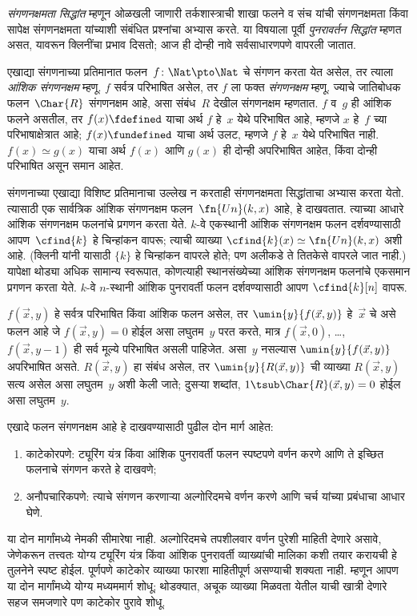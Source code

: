\documentclass[../../../include/open-logic-section]{subfiles}
\begin{document}

\emph{संगणनक्षमता सिद्धांत} म्हणून ओळखली जाणारी तर्कशास्त्राची शाखा
फलने व संच यांची संगणनक्षमता किंवा सापेक्ष संगणनक्षमता यांच्याशी संबंधित
प्रश्नांचा अभ्यास करते. या विषयाला पूर्वी \emph{पुनरावर्तन सिद्धांत}
म्हणत असत, यावरून क्लिनींचा प्रभाव दिसतो; आज ही दोन्ही नावे
सर्वसाधारणपणे वापरली जातात.

एखाद्या संगणनाच्या प्रतिमानात फलन~$f\colon \Nat \pto \Nat$ चे संगणन
करता येत असेल, तर त्याला \emph{आंशिक संगणनक्षम} म्हणू. $f$ सर्वत्र
परिभाषित असेल, तर $f$ ला फक्त \emph{संगणनक्षम} म्हणू. ज्याचे
जातिबोधक फलन~$\Char{R}$ संगणनक्षम आहे, असा संबंध~$R$ देखील
संगणनक्षम म्हणतात. $f$ व~$g$ ही आंशिक फलने असतील, तर
$f(x) \fdefined$ याचा अर्थ $f$ हे~$x$ येथे परिभाषित आहे, म्हणजे
$x$ हे~$f$ च्या परिभाषाक्षेत्रात आहे; $f(x) \fundefined$ याचा
अर्थ उलट, म्हणजे $f$ हे~$x$ येथे परिभाषित नाही. $f(x) \simeq g(x)$
याचा अर्थ $f(x)$ आणि $g(x)$ ही दोन्ही अपरिभाषित आहेत, किंवा दोन्ही
परिभाषित असून समान आहेत.

संगणनाच्या एखाद्या विशिष्ट प्रतिमानाचा उल्लेख न करताही संगणनक्षमता
सिद्धांताचा अभ्यास करता येतो. त्यासाठी एक सार्वत्रिक आंशिक संगणनक्षम
फलन~$\fn{Un}(k, x)$ आहे, हे दाखवतात. त्याच्या आधारे आंशिक संगणनक्षम
फलनांचे प्रगणन करता येते. $k$-वे एकस्थानी आंशिक संगणनक्षम फलन दर्शवण्यासाठी
आपण~$\cfind{k}$ हे चिन्हांकन वापरू; त्याची व्याख्या
$\cfind{k}(x) \simeq \fn{Un}(k, x)$ अशी आहे. (क्लिनी यांनी यासाठी
$\{ k \}$ हे चिन्हांकन वापरले होते; पण अलीकडे ते तितकेसे वापरले
जात नाही.) यापेक्षा थोड्या अधिक सामान्य स्वरूपात, कोणत्याही
स्थानसंख्येच्या आंशिक संगणनक्षम फलनांचे एकसमान प्रगणन करता येते.
$k$-वे $n$-स्थानी आंशिक पुनरावर्ती फलन दर्शवण्यासाठी आपण
$\cfind{k}[n]$ वापरू.

$f(\vec x, y)$ हे सर्वत्र परिभाषित किंवा आंशिक फलन असेल, तर
$\umin{y}{f (\vec x, y)}$ हे~$\vec x$ चे असे फलन आहे जे
$f(\vec x, y) = 0$ होईल असा लघुतम~$y$ परत करते, मात्र
$f(\vec x, 0)$, \dots, $f(\vec x, y-1)$ ही सर्व मूल्ये परिभाषित
असली पाहिजेत. असा~$y$ नसल्यास $\umin{y}{f (\vec x, y)}$
अपरिभाषित असते. $R(\vec x, y)$ हा संबंध असेल, तर
$\umin{y}{R(\vec x, y)}$ ची व्याख्या $R(\vec x, y)$ सत्य
असेल असा लघुतम~$y$ अशी केली जाते; दुसऱ्या शब्दांत,
$1 \tsub \Char{R}(\vec x, y) = 0$ होईल असा लघुतम~$y$.

एखादे फलन संगणनक्षम आहे हे दाखवण्यासाठी पुढील दोन मार्ग आहेत:
\begin{enumerate}
\item काटेकोरपणे: ट्यूरिंग यंत्र किंवा आंशिक पुनरावर्ती फलन स्पष्टपणे
  वर्णन करणे आणि ते इच्छित फलनाचे संगणन करते हे दाखवणे;
\item अनौपचारिकपणे: त्याचे संगणन करणाऱ्या अल्गोरिदमचे वर्णन करणे आणि
  चर्च यांच्या प्रबंधाचा आधार घेणे.
\end{enumerate}
या दोन मार्गांमध्ये नेमकी सीमारेषा नाही. अल्गोरिदमचे तपशीलवार
वर्णन पुरेशी माहिती देणारे असावे, जेणेकरून तत्त्वतः योग्य ट्यूरिंग
यंत्र किंवा आंशिक पुनरावर्ती व्याख्यांची मालिका कशी तयार करायची हे
तुलनेने स्पष्ट होईल. पूर्णपणे काटेकोर व्याख्या फारशा माहितीपूर्ण
असण्याची शक्यता नाही. म्हणून आपण या दोन मार्गांमध्ये योग्य मध्यममार्ग
शोधू; थोडक्यात, अचूक व्याख्या मिळवता येतील याची खात्री देणारे
सहज समजणारे पण काटेकोर पुरावे शोधू.
\end{document}
